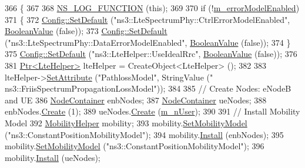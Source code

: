 \begin{DoxyCode}
366 \{
367 
368   \hyperlink{log-macros-disabled_8h_a90b90d5bad1f39cb1b64923ea94c0761}{NS\_LOG\_FUNCTION} (\textcolor{keyword}{this});
369 
370   \textcolor{keywordflow}{if} (!\hyperlink{classLenaFdBetFfMacSchedulerTestCase2_a2925931eeed894cebffed3d453e739cd}{m\_errorModelEnabled})
371     \{
372       \hyperlink{group__config_ga2e7882df849d8ba4aaad31c934c40c06}{Config::SetDefault} (\textcolor{stringliteral}{"ns3::LteSpectrumPhy::CtrlErrorModelEnabled"}, 
      \hyperlink{classns3_1_1BooleanValue}{BooleanValue} (\textcolor{keyword}{false}));
373       \hyperlink{group__config_ga2e7882df849d8ba4aaad31c934c40c06}{Config::SetDefault} (\textcolor{stringliteral}{"ns3::LteSpectrumPhy::DataErrorModelEnabled"}, 
      \hyperlink{classns3_1_1BooleanValue}{BooleanValue} (\textcolor{keyword}{false}));
374     \}
375   \hyperlink{group__config_ga2e7882df849d8ba4aaad31c934c40c06}{Config::SetDefault} (\textcolor{stringliteral}{"ns3::LteHelper::UseIdealRrc"}, 
      \hyperlink{classns3_1_1BooleanValue}{BooleanValue} (\textcolor{keyword}{false}));
376 
381   \hyperlink{classns3_1_1Ptr}{Ptr<LteHelper>} lteHelper = CreateObject<LteHelper> ();
382   
383   lteHelper->\hyperlink{classns3_1_1ObjectBase_ac60245d3ea4123bbc9b1d391f1f6592f}{SetAttribute} (\textcolor{stringliteral}{"PathlossModel"}, StringValue (\textcolor{stringliteral}{"
      ns3::FriisSpectrumPropagationLossModel"}));
384 
385   \textcolor{comment}{// Create Nodes: eNodeB and UE}
386   \hyperlink{classns3_1_1NodeContainer}{NodeContainer} enbNodes;
387   \hyperlink{classns3_1_1NodeContainer}{NodeContainer} ueNodes;
388   enbNodes.\hyperlink{classns3_1_1NodeContainer_a787f059e2813e8b951cc6914d11dfe69}{Create} (1);
389   ueNodes.\hyperlink{classns3_1_1NodeContainer_a787f059e2813e8b951cc6914d11dfe69}{Create} (\hyperlink{classLenaFdBetFfMacSchedulerTestCase2_a626729804ff1d44917c7ba38b68b8b78}{m\_nUser});
390 
391   \textcolor{comment}{// Install Mobility Model}
392   \hyperlink{classns3_1_1MobilityHelper}{MobilityHelper} mobility;
393   mobility.\hyperlink{classns3_1_1MobilityHelper_a030275011b6f40682e70534d30280aba}{SetMobilityModel} (\textcolor{stringliteral}{"ns3::ConstantPositionMobilityModel"});
394   mobility.\hyperlink{classns3_1_1MobilityHelper_a07737960ee95c0777109cf2994dd97ae}{Install} (enbNodes);
395   mobility.\hyperlink{classns3_1_1MobilityHelper_a030275011b6f40682e70534d30280aba}{SetMobilityModel} (\textcolor{stringliteral}{"ns3::ConstantPositionMobilityModel"});
396   mobility.\hyperlink{classns3_1_1MobilityHelper_a07737960ee95c0777109cf2994dd97ae}{Install} (ueNodes);

\end{DoxyCode}
